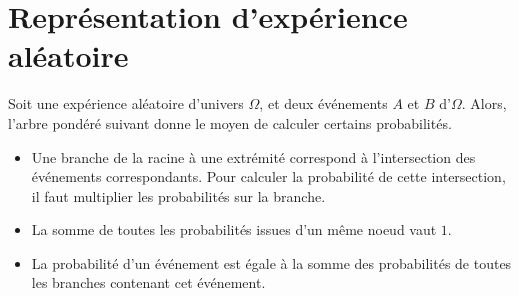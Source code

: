 \documentclass{article}
\begin{document}
\section{Représentation d'expérience aléatoire}
\begin{example}
Soit une expérience aléatoire d'univers $\Omega$, et deux événements $A$ et $B$ d'$\Omega$. Alors, l'arbre pondéré suivant donne le moyen de calculer certains probabilités.
\begin{center}
\end{center}
\end{example}
\begin{tcolorbox}
\begin{proposition}
\hfill
\begin{itemize}
\item Une branche de la racine à une extrémité correspond à l'intersection des événements correspondants. Pour calculer la probabilité de cette intersection, il faut multiplier les probabilités sur la branche.
\item La somme de toutes les probabilités issues d'un même noeud vaut $1$.
\item La probabilité d'un événement est égale à la somme des probabilités de toutes les branches contenant cet événement. 
\end{itemize}        
\end{proposition}
\end{tcolorbox}
\end{document}
